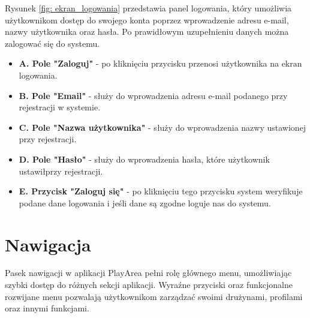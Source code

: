 \documentclass[wmii,inf,inz]{uwmthesis} %
\begin{document}
\noindent Rysunek \ref{fig: ekran_logowania} przedstawia panel logowania, który umożliwia użytkownikom dostęp do swojego konta poprzez wprowadzenie adresu e-mail, nazwy użytkownika oraz hasła. Po prawidłowym uzupełnieniu danych można zalogować się do systemu.
\begin{itemize}
    \item \textbf{A. Pole "Zaloguj"} - po kliknięciu przycisku przenosi użytkownika na ekran logowania.
    \item \textbf{B. Pole "Email"} - służy do wprowadzenia adresu e-mail podanego przy rejestracji w systemie.
    \item \textbf{C. Pole "Nazwa użytkownika"} - służy do wprowadzenia nazwy ustawionej przy rejestracji.    
    \item \textbf{D. Pole "Hasło"} - służy do wprowadzenia hasła, które użytkownik ustawiłprzy rejestracji.
    \item \textbf{E. Przycisk "Zaloguj się"} - po kliknięciu tego przycisku system weryfikuje podane dane logowania i jeśli dane są zgodne loguje nas do systemu.
\end{itemize}

\section{Nawigacja}
\noindent
Pasek nawigacji w aplikacji PlayArea pełni rolę głównego menu, umożliwiając szybki dostęp do różnych sekcji aplikacji. Wyraźne przyciski oraz funkcjonalne rozwijane menu pozwalają użytkownikom zarządzać swoimi drużynami, profilami oraz innymi funkcjami.\newline
\end{document}
